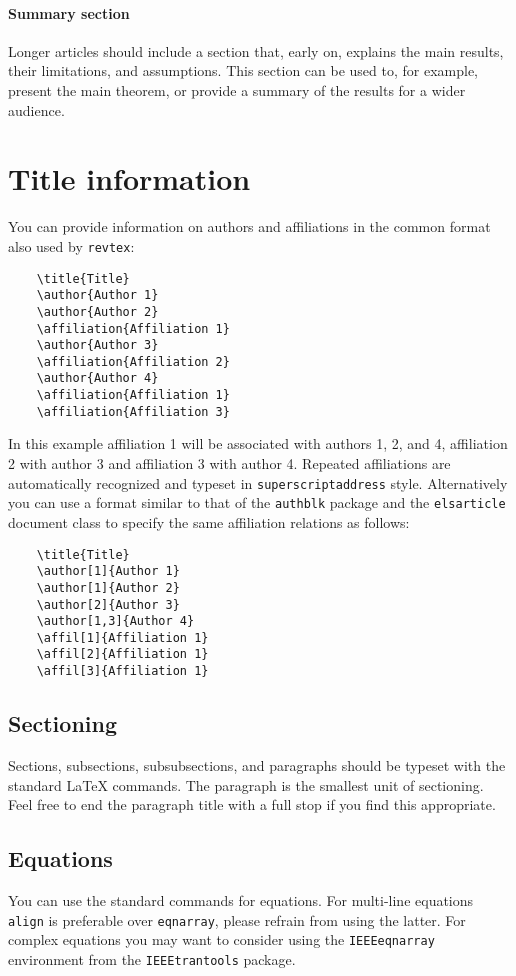 \documentclass[a4paper,noarxiv,onecolumn]{quantumarticle}
\begin{document}
	\paragraph{Summary section}
	Longer articles should include a section that, early on, explains the main results, their limitations, and assumptions.
	This section can be used to, for example, present the main theorem, or provide a summary of the results for a wider audience.
	
	\section{Title information}
	You can provide information on authors and affiliations in the common format also used by \texttt{revtex}:
	\begin{verbatim}
	\title{Title}
	\author{Author 1}
	\author{Author 2}
	\affiliation{Affiliation 1}
	\author{Author 3}
	\affiliation{Affiliation 2}
	\author{Author 4}
	\affiliation{Affiliation 1}
	\affiliation{Affiliation 3}
	\end{verbatim}
	In this example affiliation 1 will be associated with authors 1, 2, and 4, affiliation 2 with author 3 and affiliation 3 with author 4.
	Repeated affiliations are automatically recognized and typeset in \texttt{superscriptaddress} style.
	Alternatively you can use a format similar to that of the \texttt{authblk} package and the \texttt{elsarticle} document class to specify the same affiliation relations as follows:
	\begin{verbatim}
	\title{Title}
	\author[1]{Author 1}
	\author[1]{Author 2}
	\author[2]{Author 3}
	\author[1,3]{Author 4}
	\affil[1]{Affiliation 1}
	\affil[2]{Affiliation 1}
	\affil[3]{Affiliation 1}
	\end{verbatim}
	
	\subsection{Sectioning}
	Sections, subsections, subsubsections, and paragraphs should be typeset with the standard LaTeX commands. The paragraph is the smallest unit of sectioning. Feel free to end the paragraph title with a full stop if you find this appropriate.
	
	\subsection{Equations}	
	You can use the standard commands for equations. For multi-line equations \texttt{align} is preferable over \texttt{eqnarray}, please refrain from using the latter.	For complex equations you may want to consider using the \texttt{IEEEeqnarray} environment from the \texttt{IEEEtrantools} package.
	
\end{document}
